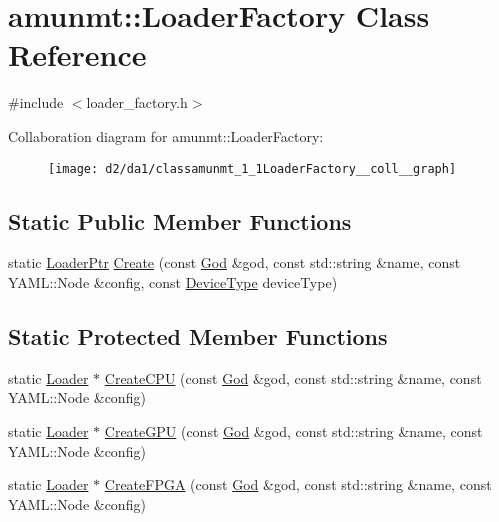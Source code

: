 \hypertarget{classamunmt_1_1LoaderFactory}{}\section{amunmt\+:\+:Loader\+Factory Class Reference}
\label{classamunmt_1_1LoaderFactory}


{\ttfamily \#include $<$loader\+\_\+factory.\+h$>$}



Collaboration diagram for amunmt\+:\+:Loader\+Factory\+:
\nopagebreak
\begin{figure}[H]
\begin{center}
\leavevmode
\texttt{[image: d2/da1/classamunmt\_1\_1LoaderFactory\_\_coll\_\_graph]}
\end{center}
\end{figure}
\subsection*{Static Public Member Functions}
\begin{DoxyCompactItemize}
\item 
static \hyperlink{namespaceamunmt_a7907c3626488deed31e31452d178d78e}{Loader\+Ptr} \hyperlink{classamunmt_1_1LoaderFactory_aaaf8621316a4c3832bcdfecbd5f69598}{Create} (const \hyperlink{classamunmt_1_1God}{God} \&god, const std\+::string \&name, const Y\+A\+M\+L\+::\+Node \&config, const \hyperlink{namespaceamunmt_a0f0dad0deb73c5a4c574d8c63833ab17}{Device\+Type} device\+Type)
\end{DoxyCompactItemize}
\subsection*{Static Protected Member Functions}
\begin{DoxyCompactItemize}
\item 
static \hyperlink{classamunmt_1_1Loader}{Loader} $\ast$ \hyperlink{classamunmt_1_1LoaderFactory_a78832d75891d43a96d36c1e61c6940b4}{Create\+C\+PU} (const \hyperlink{classamunmt_1_1God}{God} \&god, const std\+::string \&name, const Y\+A\+M\+L\+::\+Node \&config)
\item 
static \hyperlink{classamunmt_1_1Loader}{Loader} $\ast$ \hyperlink{classamunmt_1_1LoaderFactory_a78af7437386e23443b9d02bb4f8be24b}{Create\+G\+PU} (const \hyperlink{classamunmt_1_1God}{God} \&god, const std\+::string \&name, const Y\+A\+M\+L\+::\+Node \&config)
\item 
static \hyperlink{classamunmt_1_1Loader}{Loader} $\ast$ \hyperlink{classamunmt_1_1LoaderFactory_a167b89f68880a90da333d3a61458472b}{Create\+F\+P\+GA} (const \hyperlink{classamunmt_1_1God}{God} \&god, const std\+::string \&name, const Y\+A\+M\+L\+::\+Node \&config)
\end{DoxyCompactItemize}


